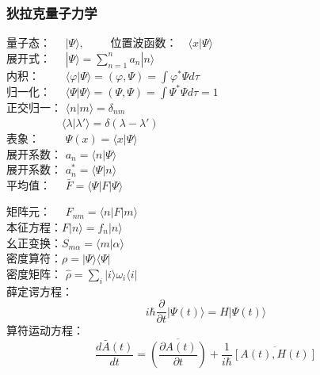 \begin{frame}  
    \frametitle{狄拉克量子力学}  
    量子态： $\hspace{1em}|\Psi \rangle, \qquad$ 位置波函数：$\hspace{1em} \langle x |\Psi \rangle$ \\ \vspace{0.2em}
    展开式： $\hspace{1em}|\Psi \rangle =\sum\limits_{n=1} ^n a_n |n \rangle$ \\
    内积：   $\hspace{2em}\langle \varphi | \Psi \rangle = (\varphi, \Psi)= \int \varphi^*\Psi d\tau $ \\  \vspace{0.2em}
    归一化： $\hspace{1em}\langle \Psi | \Psi \rangle = (\Psi, \Psi)= \int \Psi^*\Psi d\tau = 1 $ \\ \vspace{0.2em}
    正交归一： $\langle n | m \rangle = \delta_{nm} $ \\ \vspace{0.2em}
    $ \hspace{5em} \langle \lambda | \lambda' \rangle = \delta(\lambda-\lambda') $\\ \vspace{0.2em}
    表象： $\hspace{2em}\Psi(x)= \langle x | \Psi \rangle$ \\ \vspace{0.2em}
    展开系数： $ a_n= \langle n | \Psi \rangle$ \\ \vspace{0.2em}
    展开系数： $ a_n ^*= \langle \Psi | n \rangle$ \\ \vspace{0.2em}
    平均值：  $\hspace{1em}\bar{F} = \langle \Psi |F | \Psi \rangle$ \\ \vspace{0.2em}
\end{frame} 
 
\begin{frame} 
    矩阵元：  $\hspace{1em}F_{nm} = \langle n |F | m \rangle$ \\ \vspace{0.2em}
    本征方程：$F|n\rangle =f_n |n\rangle$ \\ \vspace{0.2em}
    幺正变换：$S_{m\alpha} =\langle m| \alpha \rangle $ \\ \vspace{0.2em}
    密度算符：$\rho = |\Psi\rangle\langle \Psi | $ \\ \vspace{0.2em}
    密度矩阵： $\hat{\rho} = \sum\limits_{i}| i \rangle  \omega_i \langle i | $ \\ \vspace{0.2em}
    薛定谔方程：$$ i\hbar \frac{\partial }{\partial t} |\Psi(t)\rangle = H|\Psi(t)\rangle $$ 
    算符运动方程：$$ \frac{d\bar{A}(t)}{dt}=\overline{(\frac{\partial A(t) }{\partial t})}  +\frac{1}{i\hbar} \overline{[A(t),H(t)]}$$
\end{frame} 
 
